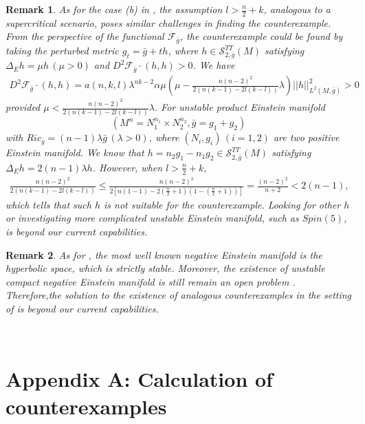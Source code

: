 \documentclass[12pt]{amsart}
\newtheorem{remark}{Remark}[section]
\newcommand{\bg}{\bar{g}}
\numberwithin{equation}{section}
\begin{document}
\begin{remark}
    As for the case (b) in , the assumption $l>\frac{n}{2}+k$, analogous to a supercritical scenario, poses similar challenges in finding the counterexample. From the perspective of the functional $\mathcal{F}_{\bg}$, the counterexample could be found by taking the perturbed metric $g_t=\bg+th$, where $h\in\mathcal{S}^{TT}_{2,\bg}(M)$ satisfying $\Delta_Eh=\mu h\,(\mu>0)$ and $D^2\mathcal{F}_{\bg}\cdot(h,h)>0$. We have
    \begin{align*}
        D^2\mathcal{F}_{\bg}\cdot(h,h) =a(n,k,l)\lambda^{nk-2}\alpha\mu\left(\mu-\frac{n(n-2)^2}{2\left(n(k-1)-2l(k-l)\right)}\lambda\right)||h||_{L^2(M,\bg)}^2>0
    \end{align*}
    provided $\mu<\frac{n(n-2)^2}{2\left(n(k-1)-2l(k-l)\right)}\lambda$. For unstable product Einstein manifold \[ (M^n=N_1^{n_1}\times N_2^{n_2},\bg=g_1+g_2)\] with $Ric_{\bg}=(n-1)\lambda\bg\, (\lambda>0)$, where $(N_i,g_i)\,(i=1,2)$ are two positive Einstein manifold. We know that $h=n_2g_1-n_1g_2\in\mathcal{S}^{TT}_{2,\bg}(M)$ satisfying $\Delta_Eh=2(n-1)\lambda h$. However, when $l>\frac{n}{2}+k$,
    \begin{align*}
        \frac{n(n-2)^2}{2\left(n(k-1)-2l(k-l)\right)}\leq\frac{n(n-2)^2}{2\left[n(1-1)-2(\frac{n}{2}+1)(1-(\frac{n}{2}+1))\right]}=\frac{(n-2)^2}{n+2}<2(n-1),
    \end{align*}
    which tells that such $h$ is not suitable for the counterexample. Looking for other $h$ or investigating more complicated unstable Einstein manifold, such as $Spin(5)$, is beyond our current capabilities. 
\end{remark}

\begin{remark}
    As for , the most well known negative Einstein manifold is the hyperbolic space, which is strictly stable. Moreover, the existence of unstable compact negative Einstein manifold is still remain an open problem \cite{Kroncke}. Therefore,the solution to the existence of analogous counterexamples in the setting of  is beyond our current capabilities.
\end{remark}



\ \\

\section*{Appendix A: Calculation of counterexamples}
\end{document}
